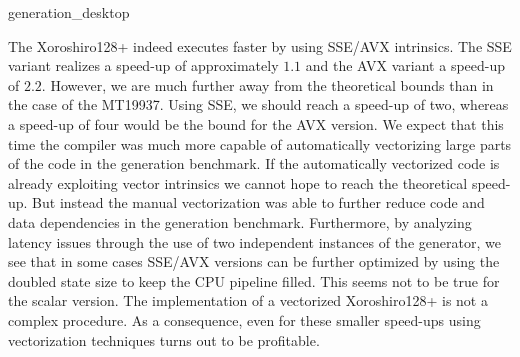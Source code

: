 \documentclass{stdlocal}
\begin{document}
    \begin{table}
      \center
      \caption[Generation Benchmark Data for ]{%
        Results achieved by running the generation benchmark on the  at a frequency of $4.51\appendUnit{GHz}$ with all implemented variants of given PRNGs.
        While running the benchmark, $16\appendUnit{GiB}$ of random numbers were generated and temporarily stored in a cache of size $16384\appendUnit{B}$ by iterating $2^{20}$ times over its content.
        During the execution, there were no cache or branch misses.
        The values for cycles, instructions, and IPCs were averaged over the calls to the advancing routine of the respective generator.
      }
      \label{tab:generation-data-i7}
      \footnotesize
      \renewcommand{\arraystretch}{1.2}
      {generation_desktop}
    \end{table}

    The Xoroshiro128+ indeed executes faster by using SSE/AVX intrinsics.
    The SSE variant realizes a speed-up of approximately $1.1$ and the AVX variant a speed-up of $2.2$.
    However, we are much further away from the theoretical bounds than in the case of the MT19937.
    Using SSE, we should reach a speed-up of two, whereas a speed-up of four would be the bound for the AVX version.
    We expect that this time the compiler was much more capable of automatically vectorizing large parts of the code in the generation benchmark.
    If the automatically vectorized code is already exploiting vector intrinsics we cannot hope to reach the theoretical speed-up.
    But instead the manual vectorization was able to further reduce code and data dependencies in the generation benchmark.
    Furthermore, by analyzing latency issues through the use of two independent instances of the generator, we see that in some cases SSE/AVX versions can be further optimized by using the doubled state size to keep the CPU pipeline filled.
    This seems not to be true for the scalar version.
    The implementation of a vectorized Xoroshiro128+ is not a complex procedure.
    As a consequence, even for these smaller speed-ups using vectorization techniques turns out to be profitable.
\end{document}
